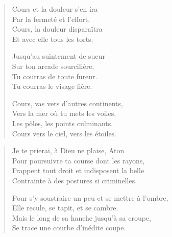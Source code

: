 \begin{verse}\quatrain
  Cours et la douleur s’en ira\\ 
  Par la fermeté et l’effort.\\ 
  Cours, la douleur disparaîtra\\ 
  Et avec elle tous les torts.  %

  Jusqu’au suintement de sueur\\ 
  Sur ton arcade sourcilière,\\ 
  Tu courras de toute fureur.\\ 
  Tu courras le visage fière.  %

  Cours, vas vers d’autres continents,\\ 
  Vers la mer où tu mets les voiles,\\ 
  Les pôles, les points culminants.\\ 
  Cours vers le ciel, vers les étoiles.  %
\end{verse}

\begin{verse}\quatrain
  Je te prierai, à Dieu ne plaise, Aton%
  \\ 
  Pour poursuivre ta course dont les rayons,\\ 
  Frappent tout droit et indisposent la belle\\ 
  Contrainte à des postures si criminelles.  %

  Pour s’y soustraire un peu et se mettre à l’ombre,\\ 
  Elle recule, se tapit, et se cambre.\\ 
  Mais le long de sa hanche jusqu’à sa croupe,\\ 
  Se trace une courbe d’inédite coupe.  %
\end{verse}

